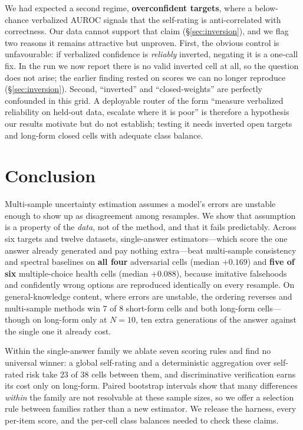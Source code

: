 \documentclass[11pt]{article}
\begin{document}
We had expected a second regime, \textbf{overconfident targets}, where a below-chance verbalized
AUROC signals that the self-rating is anti-correlated with correctness. Our data cannot support
that claim (\S\ref{sec:inversion}), and we flag two reasons it remains attractive but unproven.
First, the obvious control is unfavourable: if verbalized confidence is \emph{reliably}
inverted, negating it is a one-call fix. In the run we now report there is no valid inverted
cell at all, so the question does not arise; the earlier finding rested on scores we can no
longer reproduce (\S\ref{sec:inversion}). Second, ``inverted'' and ``closed-weights'' are perfectly
confounded in this grid. A deployable router of the form ``measure verbalized reliability on
held-out data, escalate where it is poor'' is therefore a hypothesis our results motivate but do
not establish; testing it needs inverted open targets and long-form closed cells with adequate
class balance.

\section{Conclusion}
Multi-sample uncertainty estimation assumes a model's errors are unstable enough to show up as
disagreement among resamples. We show that assumption is a property of the \emph{data}, not of
the method, and that it fails predictably. Across six targets and twelve datasets, single-answer
estimators---which score the one answer already generated and pay nothing extra---beat
multi-sample consistency and spectral baselines on \textbf{all four} adversarial cells (median
$+0.169$) and \textbf{five of six} multiple-choice health cells (median $+0.088$), because
imitative falsehoods and confidently wrong options are reproduced identically on every resample.
On general-knowledge content, where errors are unstable, the ordering reverses and multi-sample
methods win $7$ of $8$ short-form cells and both long-form cells---though on long-form only at
$N{=}10$, ten extra generations of the answer against the single one it already cost.

Within the single-answer family we ablate seven scoring rules and find no universal winner: a
global self-rating and a deterministic aggregation over self-rated risk take $23$ of $38$ cells
between them, and discriminative verification earns its cost only on long-form. Paired bootstrap
intervals show that many differences \emph{within} the family are not resolvable at these sample
sizes, so we offer a selection rule between families rather than a new estimator. We release the
harness, every per-item score, and the per-cell class balances needed to check these claims.
\end{document}
